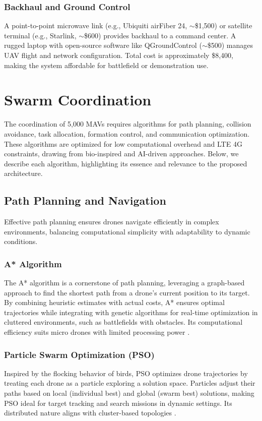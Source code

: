 \documentclass{article}
\begin{document}
\subsubsection{Backhaul and Ground Control}
A point-to-point microwave link (e.g., Ubiquiti airFiber 24, $\sim$\$1,500) or satellite terminal (e.g., Starlink, $\sim$\$600) provides backhaul to a command center. A rugged laptop with open-source software like QGroundControl ($\sim$\$500) manages UAV flight and network configuration. Total cost is approximately \$8,400, making the system affordable for battlefield or demonstration use.

\section{Swarm Coordination}
The coordination of 5,000 MAVs requires algorithms for path planning, collision avoidance, task allocation, formation control, and communication optimization. These algorithms are optimized for low computational overhead and LTE 4G constraints, drawing from bio-inspired and AI-driven approaches. Below, we describe each algorithm, highlighting its essence and relevance to the proposed architecture.

\subsection{Path Planning and Navigation}
Effective path planning ensures drones navigate efficiently in complex environments, balancing computational simplicity with adaptability to dynamic conditions.

\subsubsection{A* Algorithm}
The A* algorithm is a cornerstone of path planning, leveraging a graph-based approach to find the shortest path from a drone’s current position to its target. By combining heuristic estimates with actual costs, A* ensures optimal trajectories while integrating with genetic algorithms for real-time optimization in cluttered environments, such as battlefields with obstacles. Its computational efficiency suits micro drones with limited processing power \cite{Hart1968, Liu2019}.

\subsubsection{Particle Swarm Optimization (PSO)}
Inspired by the flocking behavior of birds, PSO optimizes drone trajectories by treating each drone as a particle exploring a solution space. Particles adjust their paths based on local (individual best) and global (swarm best) solutions, making PSO ideal for target tracking and search missions in dynamic settings. Its distributed nature aligns with cluster-based topologies \cite{Kennedy1995, Zhang2017}.
\end{document}
